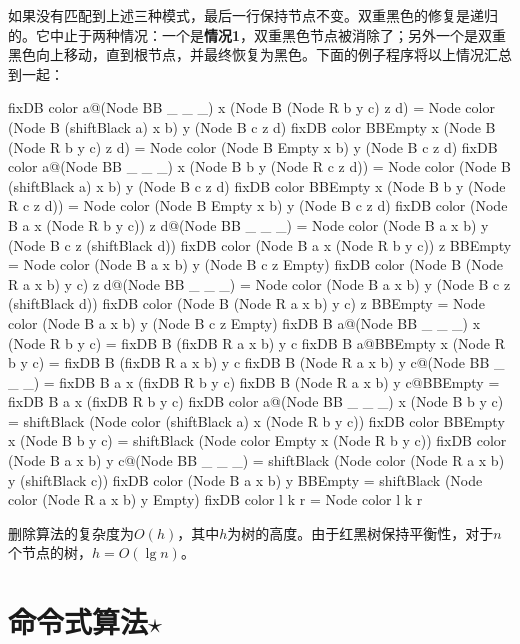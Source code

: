 \documentclass[b5paper]{ctexart}
\begin{document}
如果没有匹配到上述三种模式，最后一行保持节点不变。双重黑色的修复是递归的。它中止于两种情况：一个是\textbf{情况1}，双重黑色节点被消除了；另外一个是双重黑色向上移动，直到根节点，并最终恢复为黑色。下面的例子程序将以上情况汇总到一起：

\begin{Haskell}
fixDB color a@(Node BB _ _ _) x (Node B (Node R b y c) z d)
      = Node color (Node B (shiftBlack a) x b) y (Node B c z d)
fixDB color BBEmpty x (Node B (Node R b y c) z d)
      = Node color (Node B Empty x b) y (Node B c z d)
fixDB color a@(Node BB _ _ _) x (Node B b y (Node R c z d))
      = Node color (Node B (shiftBlack a) x b) y (Node B c z d)
fixDB color BBEmpty x (Node B b y (Node R c z d))
      = Node color (Node B Empty x b) y (Node B c z d)
fixDB color (Node B a x (Node R b y c)) z d@(Node BB _ _ _)
      = Node color (Node B a x b) y (Node B c z (shiftBlack d))
fixDB color (Node B a x (Node R b y c)) z BBEmpty
      = Node color (Node B a x b) y (Node B c z Empty)
fixDB color (Node B (Node R a x b) y c) z d@(Node BB _ _ _)
      = Node color (Node B a x b) y (Node B c z (shiftBlack d))
fixDB color (Node B (Node R a x b) y c) z BBEmpty
      = Node color (Node B a x b) y (Node B c z Empty)
fixDB B a@(Node BB _ _ _) x (Node R b y c)
      = fixDB B (fixDB R a x b) y c
fixDB B a@BBEmpty x (Node R b y c)
      = fixDB B (fixDB R a x b) y c
fixDB B (Node R a x b) y c@(Node BB _ _ _)
      = fixDB B a x (fixDB R b y c)
fixDB B (Node R a x b) y c@BBEmpty
      = fixDB B a x (fixDB R b y c)
fixDB color a@(Node BB _ _ _) x (Node B b y c)
      = shiftBlack (Node color (shiftBlack a) x (Node R b y c))
fixDB color BBEmpty x (Node B b y c)
      = shiftBlack (Node color Empty x (Node R b y c))
fixDB color (Node B a x b) y c@(Node BB _ _ _)
      = shiftBlack (Node color (Node R a x b) y (shiftBlack c))
fixDB color (Node B a x b) y BBEmpty
      = shiftBlack (Node color (Node R a x b) y Empty)
fixDB color l k r = Node color l k r
\end{Haskell}

删除算法的复杂度为$O(h)$，其中$h$为树的高度。由于红黑树保持平衡性，对于$n$个节点的树，$h = O(\lg n)$。

\begin{Exercise}
\end{Exercise}

\section{命令式算法$\star$}
\end{document}
